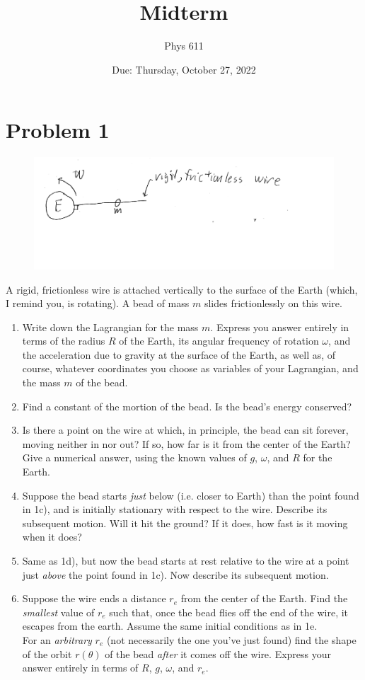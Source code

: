 \documentclass[12pt]{article}
\begin{document}
\title{Midterm}
\author{Phys 611}
\date{Due: Thursday, October 27, 2022}
\maketitle

\section*{Problem 1}
\begin{figure}[H]
    \includegraphics{Problem1}
    \centering
\end{figure}
A rigid, frictionless wire is attached vertically to the surface of the Earth (which, I remind you, is rotating). A bead of mass $m$ slides frictionlessly on this wire.
\begin{enumerate}[label=(\alph*)]
    \item Write down the Lagrangian for the mass $m$. Express you answer entirely in terms of the radius $R$ of the Earth, its angular frequency of rotation $\omega$, and the acceleration due to gravity at the surface of the Earth, as well as, of course, whatever coordinates you choose as variables of your Lagrangian, and the mass $m$ of the bead.
    \item Find a constant of the mortion of the bead. Is the bead's energy conserved?
    \item Is there a point on the wire at which, in principle, the bead can sit forever, moving neither in nor out? If so, how far is it from the center of the Earth? Give a numerical answer, using the known values of $g$, $\omega$, and $R$ for the Earth.
    \item Suppose the bead starts \textit{just} below (i.e. closer to Earth) than the point found in 1c), and is initially stationary with respect to the wire. Describe its subsequent motion. Will it hit the ground? If it does, how fast is it moving when it does?
    \item Same as 1d), but now the bead starts at rest relative to the wire at a point just \textit{above} the point found in 1c). Now describe its subsequent motion.
    \item Suppose the wire ends a distance $r_e$ from the center of the Earth. Find the \textit{smallest} value of $r_e$ such that, once the bead flies off the end of the wire, it escapes from the earth. Assume the same initial conditions as in 1e. \\ 
        For an \textit{arbitrary} $r_e$ (not necessarily the one you've just found) find the shape of the orbit $r(\theta)$ of the bead \textit{after} it comes off the wire. Express your answer entirely in terms of $R$, $g$, $\omega$, and $r_e$.
\end{enumerate}
\end{document}
